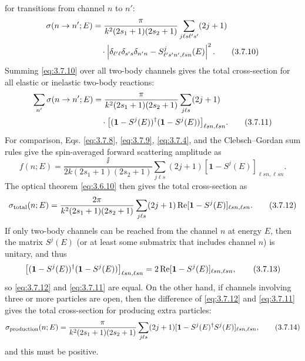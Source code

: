 for transitions from channel $n$ to $n'$:
\begin{align}
  \sigma(n\to n';E)
  &=\frac{\pi}{k^2(2s_1+1)(2s_2+1)}
    \sum_{j\ell s\ell's'}(2j+1) \notag\\
  &\quad\cdot\left|
    \delta_{\ell'\ell}\delta_{s's}\delta_{n'n}
    -S^j_{\ell's'n',\ell sn}(E)\right|^2.
  \tag{3.7.10}\label{eq:3.7.10}
\end{align}
Summing \eqref{eq:3.7.10} over all two-body channels gives the total cross-section for
all elastic or inelastic two-body reactions:
\begin{align}
  \sum_{n'}\sigma(n\to n';E)
  &=\frac{\pi}{k^2(2s_1+1)(2s_2+1)}
    \sum_{j\ell s}(2j+1) \notag\\
  &\quad\cdot
    \bigl[(\mathbf{1}-S^j(E))^\dagger(\mathbf{1}-S^j(E))\bigr]_{\ell sn,\ell sn}.
  \tag{3.7.11}\label{eq:3.7.11}
\end{align}
For comparison, Eqs. \eqref{eq:3.7.8}, \eqref{eq:3.7.9}, \eqref{eq:3.7.4}, and the Clebsch--Gordan sum
rules give the spin-averaged forward scattering amplitude as
\[
  f(n;E)=\frac{\ii}{2k(2s_1+1)(2s_2+1)}
  \sum_{j\ell s}(2j+1)[\mathbf{1}-S^j(E)]_{\ell sn,\ell sn}.
\]
The optical theorem \eqref{eq:3.6.10} then gives the total cross-section as
\begin{equation}
  \sigma_{\rm total}(n;E)
  =\frac{2\pi}{k^2(2s_1+1)(2s_2+1)}
  \sum_{j\ell s}(2j+1)\mathop{\rm Re}
  [\mathbf{1}-S^j(E)]_{\ell sn,\ell sn}.
  \tag{3.7.12}\label{eq:3.7.12}
\end{equation}
If only two-body channels can be reached from the channel $n$ at energy $E$,
then the matrix $S^j(E)$ (or at least some submatrix that includes channel
$n$) is unitary, and thus
\begin{equation}
  \bigl[(\mathbf{1}-S^j(E))^\dagger(\mathbf{1}-S^j(E))\bigr]_{\ell sn,\ell sn}
  =2\mathop{\rm Re}[\mathbf{1}-S^j(E)]_{\ell sn,\ell sn},
  \tag{3.7.13}\label{eq:3.7.13}
\end{equation}
so \eqref{eq:3.7.12} and \eqref{eq:3.7.11} are equal. On the other hand, if channels involving
three or more particles are open, then the difference of \eqref{eq:3.7.12} and
\eqref{eq:3.7.11} gives the total cross-section for producing extra particles:
\begin{equation}
  \sigma_{\rm production}(n;E)
  =\frac{\pi}{k^2(2s_1+1)(2s_2+1)}
  \sum_{j\ell s}(2j+1)
  [\mathbf{1}-S^j(E)^\dagger S^j(E)]_{\ell sn,\ell sn},
  \tag{3.7.14}\label{eq:3.7.14}
\end{equation}
and this must be positive.

